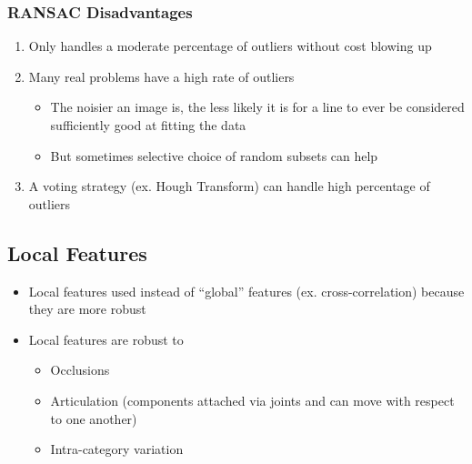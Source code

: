 \documentclass[letterpaper,12pt]{article}
\begin{document}
\subsubsection{RANSAC Disadvantages}
\begin{enumerate}
 \item Only handles a moderate percentage of outliers without cost blowing up
 \item Many real problems have a high rate of outliers
       \begin{itemize}
        \item The noisier an image is, the less likely it is for a line to ever be considered sufficiently good at fitting the data
        \item But sometimes selective choice of random subsets can help
       \end{itemize}
 \item A voting strategy (ex. Hough Transform) can handle high percentage of outliers
\end{enumerate}

\subsection{Local Features}
\begin{itemize}
 \item Local features used instead of ``global'' features (ex. cross-correlation) because they are more robust
 \item Local features are robust to
       \begin{itemize}
        \item Occlusions
        \item Articulation (components attached via joints and can move with respect to one another)
        \item  Intra-category variation
       \end{itemize}
\end{itemize}
\end{document}
